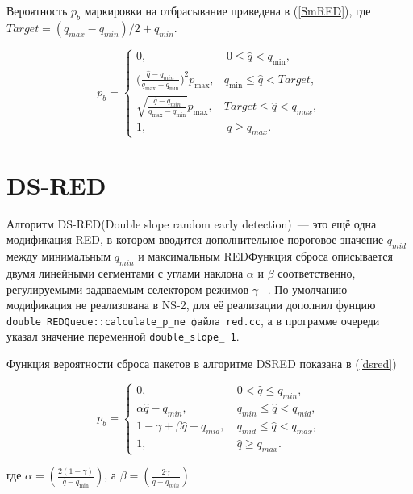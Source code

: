 Вероятность $p_{b}$ маркировки на отбрасывание приведена в (\ref{SmRED}), где $ Target = (q_{max} - q_{min})/2 + q_{min} $.

\begin{equation}
\label{SmRED}
p_{b} = \begin{cases}
        0, &  \ 0 \leqslant \hat{q} < q_{\min},
        \\
        ({\frac{\hat{q} - q_{min}}{q_{\max} - q_{\min}})^2} {p_{\max}}, &  q_{\min} \leqslant  \hat{q} < {Target},
        \\
        \sqrt{{\frac{\hat{q} - q_{min}}{q_{\max} - q_{\min}}}} {p_{\max}}, & {Target} \leqslant  \hat{q} < q_{max},
        \\
        1, &  \ \hat{q} \geqslant q_{max}.
\end{cases}
\end{equation}


\section{DS-RED}

Алгоритм DS-RED(Double slope random early detection)~--- это ещё одна модификация RED, в котором вводится дополнительное пороговое значение $q_{mid}$ между минимальным $q_{min}$ и максимальным
REDФункция сброса описывается двумя линейными сегментами с углами наклона $\alpha $ и $\beta $ соответственно, регулируемыми
задаваемым селектором режимов $\gamma$ ~\citep{DSRED}.  По умолчанию модификация не реализована в NS-2, для её реализации дополнил фунцию \verb|double REDQueue::calculate_p_ne файла red.cc|, а в программе очереди указал значение переменной \verb|double_slope_ 1|. 

Функция вероятности сброса пакетов в алгоритме DSRED показана в (\ref{dsred})

\begin{equation}
\label{dsred}
p_{b} =\begin{cases}
        0, &  \  0 < \hat{q} \leqslant q_{min}, 
        \\
        \alpha{\hat{q} - q_{min}}, & \ q_{min} \leqslant \hat{q} < q_{mid}, 
        \\
        1 - \gamma + \beta{\hat{q} - q_{mid}}, & \ q_{mid} \leqslant \hat{q} < q_{max}, 
        \\
        1, &  \ \hat{q} \geqslant  q_{max}.
\end{cases}
\end{equation}

где $\alpha = (\frac{2(1 - \gamma)}{\hat{q} - q_{\min}})$, а $\beta = (\frac{2\gamma}{\hat{q} - q_{min}})$


